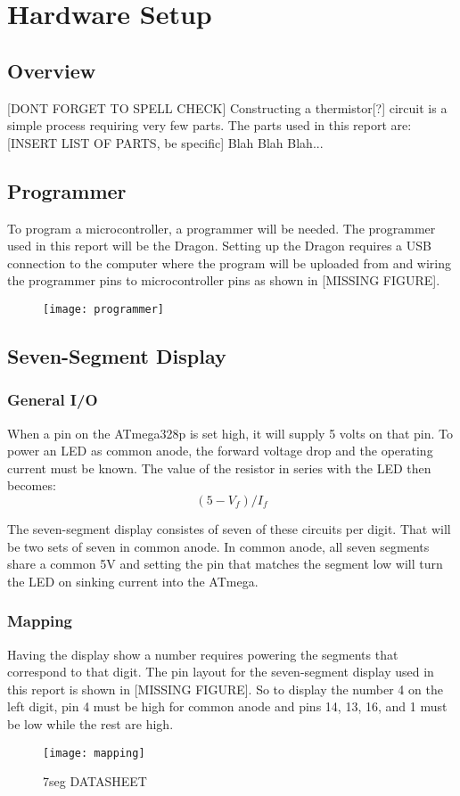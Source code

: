 \documentclass[main.tex]{subfiles}
\begin{document}
\chapter{Hardware Setup}
	\section{Overview}
	[DONT FORGET TO SPELL CHECK]
	Constructing a thermistor[?] circuit is a simple process requiring  very few parts. The parts
	used in this report are:
	[INSERT LIST OF PARTS, be specific]
	Blah Blah Blah...
	
	
	\section{Programmer}
	To program a microcontroller, a programmer will be needed. The programmer used in this report
	will be the Dragon. Setting up the Dragon requires a USB connection to the computer where
	the program will be uploaded from and wiring the programmer pins to microcontroller pins
	as shown in [MISSING FIGURE].
	\begin{figure}[H]
		\begin{center}
			\texttt{[image: programmer]}
		\end{center}
		\caption{}
		\label{fig:test}
	\end{figure}	


	\section{Seven-Segment Display}
		\subsection{General I/O}
		When a pin on the ATmega328p is set high, it will supply 5 volts on that pin. To power an
		LED as common anode, the forward voltage drop and the operating current must be known.
		The value of the resistor in series with the LED then becomes: \[(5 - V_f)/I_f\]
		
		The seven-segment display consistes of seven of these circuits per digit. That will be two sets
		of seven in common anode. In common anode, all seven segments share a common 5V and setting the
		pin that matches the segment low will turn the LED on sinking current into the ATmega.
		
		
		\subsection{Mapping}
		Having the display show a number requires powering the segments that correspond to that digit.
		The pin layout for the seven-segment display used in this report is shown in [MISSING FIGURE].
		So to display the number 4 on the left digit, pin 4 must be high for common anode and pins
		14, 13, 16, and 1 must be low while the rest are high.
		\begin{figure}[H]
			\begin{center}
				\texttt{[image: mapping]}
			\end{center}
			\caption{7seg DATASHEET}
			\label{fig:whatIsThis}
		\end{figure}
		
\end{document}
